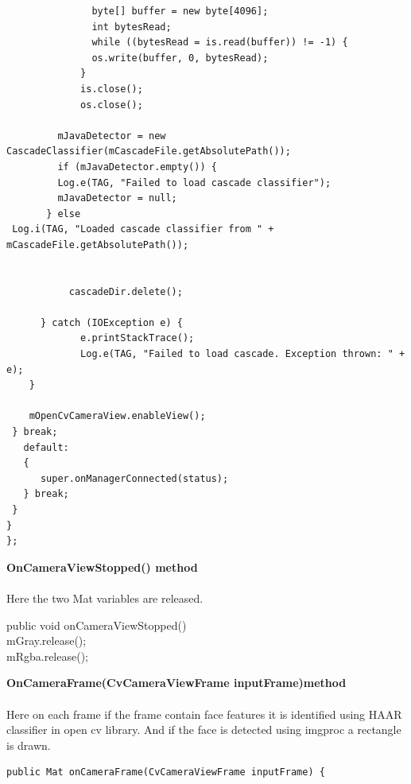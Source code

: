 \documentclass[10pt,a4paper,twoside]{report}
\begin{document}
\begin{appendix}
\begin{flushleft}
\begin{small}
\begin{lstlisting}
               byte[] buffer = new byte[4096];
               int bytesRead;
               while ((bytesRead = is.read(buffer)) != -1) {
               os.write(buffer, 0, bytesRead);
             }
             is.close();
             os.close();

         mJavaDetector = new CascadeClassifier(mCascadeFile.getAbsolutePath());
         if (mJavaDetector.empty()) {
         Log.e(TAG, "Failed to load cascade classifier");
         mJavaDetector = null;
       } else
 Log.i(TAG, "Loaded cascade classifier from " + mCascadeFile.getAbsolutePath());


           cascadeDir.delete();

      } catch (IOException e) {
             e.printStackTrace();
             Log.e(TAG, "Failed to load cascade. Exception thrown: " + e);
    }

    mOpenCvCameraView.enableView();
 } break;
   default:
   {
      super.onManagerConnected(status);
   } break;
 }
}
};

\end{lstlisting}
\end{small}
\end{flushleft}
\begin{flushleft}
\textbf{OnCameraViewStopped() method}\\

\end{flushleft}
\paragraph{ }Here the two Mat variables are released.

\begin{flushleft}
\begin{flushleft}

\end{flushleft}
public void onCameraViewStopped() {\\
    mGray.release();\\
    mRgba.release();\\
}
\end{flushleft}

\newpage
\begin{flushleft}
\textbf{OnCameraFrame(CvCameraViewFrame inputFrame)method}
\end{flushleft}
\paragraph{ }Here on each frame if the frame contain face features it is identified using HAAR classifier in open cv library. And if the face is detected using imgproc a rectangle is drawn.
\begin{flushleft}
\begin{tiny}
\begin{lstlisting}
public Mat onCameraFrame(CvCameraViewFrame inputFrame) {


\end{lstlisting}
\end{tiny}
\end{flushleft}
\end{appendix}
\end{document}
